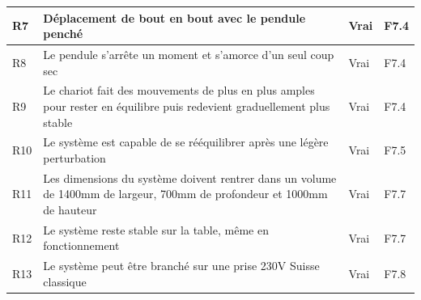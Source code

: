 \begin{table}[H]
{\begin{tabular}{|l|l|l|l|}
      R7                                                                                                                      & Déplacement de bout en bout avec le pendule penché                      & Vrai                     & F7.4              \\ \hline
      R8                                                                                                                      & Le pendule s'arrête un moment et s'amorce d'un seul coup sec            & Vrai                     & F7.4              \\ \hline
      R9                                                                                                                      &
      Le chariot fait des mouvements de plus en plus amples pour rester en équilibre puis redevient graduellement plus stable &
      Vrai                                                                                                                    &
      F7.4                                                                                                                                                                                                                                             \\ \hline
      R10                                                                                                                     & Le système est capable de se rééquilibrer après une légère perturbation & Vrai                     & F7.5              \\ \hline
      R11                                                                                                                     &
      Les dimensions du système doivent rentrer dans un volume de 1400mm de largeur, 700mm de profondeur et 1000mm de hauteur &
      Vrai                                                                                                                    &
      F7.7                                                                                                                                                                                                                                             \\ \hline
      R12                                                                                                                     & Le système reste stable sur la table, même en fonctionnement            & Vrai                     & F7.7              \\ \hline
      R13                                                                                                                     & Le système peut être branché sur une prise 230V Suisse classique        & Vrai                     & F7.8              \\ \hline

\end{tabular}}
\end{table}
